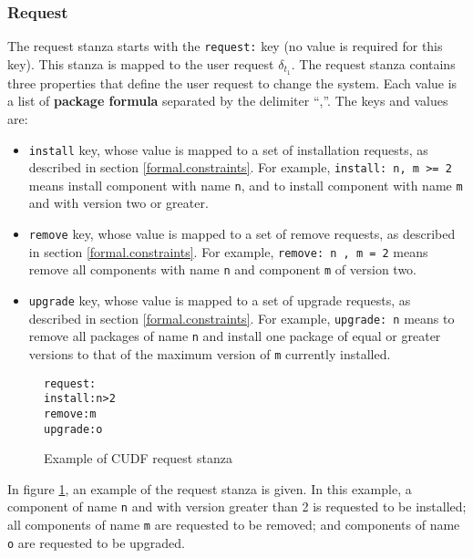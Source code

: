 \subsubsection{Request}
\label{formal.cudfdes.request}
The request stanza starts with the \verb+request:+ key (no value is required for this key).
This stanza is mapped to the user request $\delta_{t_1}$.
The request stanza contains three properties that define the user request to change the system.
Each value is a list of \textbf{package formula} separated by the delimiter ``,''.
The keys and values are:
\begin{itemize}
  \item \verb+install+ key, whose value is mapped to a set of installation requests, as described in section \ref{formal.constraints}.
  For example, \verb+install: n, m >= 2+ means install component with name \verb+n+, and to install component with name \verb+m+ and with version two or greater.
  \item \verb+remove+ key, whose value is mapped to a set of remove requests, as described in section \ref{formal.constraints}.
  For example, \verb+remove: n , m = 2+ means remove all components with name \verb+n+ and component \verb+m+ of version two.
  \item \verb+upgrade+ key, whose value is mapped to a set of upgrade requests, as described in section \ref{formal.constraints}.
  For example, \verb+upgrade: n+ means to remove all packages of name \verb+n+ and install one package of equal or greater versions to that of the maximum version of \verb+m+ currently installed. 
\end{itemize}


\begin{figure}[htp] 
\begin{center}
\begin{alltt}
request:
install: n > 2
remove: m
upgrade: o
\end{alltt}
  \caption{Example of CUDF request stanza}
  \label{formal.cudfrequeststanza}
\end{center}
\end{figure}

In figure \ref{formal.cudfrequeststanza}, an example of the request stanza is given.
In this example, a component of name \verb+n+ and with version greater than 2 is requested to be installed; all components of name \verb+m+ are requested to be removed;
and components of name \verb+o+ are requested to be upgraded.

